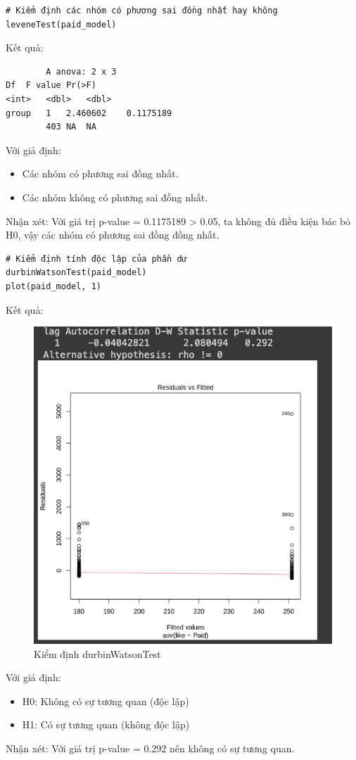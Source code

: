 \begin{itemize}
\begin{itemize}
\begin{itemize}
    \begin{lstlisting}
# Kiểm định các nhóm có phương sai đồng nhất hay không
leveneTest(paid_model)
    \end{lstlisting}
    Kết quả:
    \begin{lstlisting}
        A anova: 2 x 3
Df	F value	Pr(>F)
<int>	<dbl>	<dbl>
group	1	2.460602	0.1175189
        403	NA	NA

    \end{lstlisting}
    Với giả định:
    \begin{itemize}
        \item Các nhóm có phương sai đồng nhất.
        \item Các nhóm không có phương sai đồng nhất.
    \end{itemize}
    Nhận xét: Với giá trị p-value = 0.1175189 > 0.05, ta không đủ điều kiện bác bỏ H0, vậy các nhóm có phương sai đồng đồng nhất.
    \end{itemize}
    \begin{lstlisting}
# Kiểm định tính độc lập của phần dư
durbinWatsonTest(paid_model)
plot(paid_model, 1)
    \end{lstlisting}
    Kết quả:
    \begin{figure}[H]
        \centering
        \includegraphics[width=0.8\linewidth]{part23_figures/16.png}
        \caption{Kiểm định durbinWatsonTest}
        \label{fig:Kiểm định durbinWatsonTest}
    \end{figure}
    Với giả định:
    \begin{itemize}
        \item H0: Không có sự tương quan (độc lập)
        \item H1: Có sự tương quan (không độc lập)
    \end{itemize}
    Nhận xét: Với giá trị p-value = 0.292 nên không có sự tương quan.


\end{itemize}
\end{itemize}
